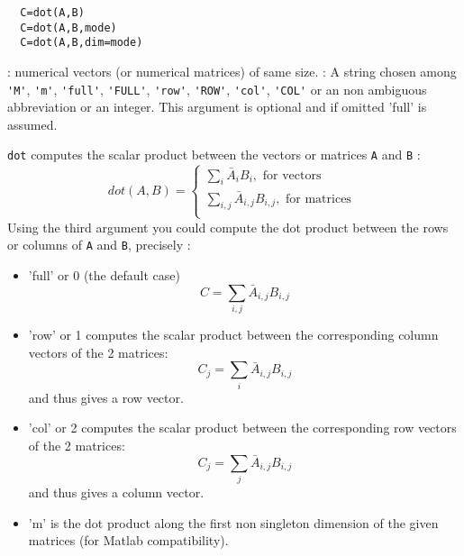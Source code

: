 \begin{mandesc}
\end{mandesc}
\begin{calling_sequence}
\begin{verbatim}
  C=dot(A,B)  
  C=dot(A,B,mode)  
  C=dot(A,B,dim=mode)  
\end{verbatim}
\end{calling_sequence}
\begin{parameters}
  \begin{varlist}
    : numerical vectors (or numerical matrices) of same size.
    : A string chosen among \verb+'M'+, \verb+'m'+, \verb+'full'+, \verb+'FULL'+, \verb+'row'+,
    \verb+'ROW'+, \verb+'col'+, \verb+'COL'+ or an non ambiguous abbreviation or an integer. 
    This argument is optional and if omitted 'full' is assumed.
  \end{varlist}
\end{parameters}
\begin{mandescription}
  \verb+dot+ computes the scalar product between the vectors or matrices \verb+A+ and \verb+B+ :
$$
dot(A,B) = \left\{
\begin{array}{l}
     \sum_{i} \bar{A}_i B_i, \mbox{ for vectors } \\
     \sum_{i,j} \bar{A}_{i,j} B_{i,j}, \mbox{ for matrices } \\
\end{array} \right.
$$ 
 Using the third argument you could compute the dot product between the rows or columns of
 \verb+A+ and \verb+B+, precisely :
  \begin{itemize}
    \item 'full' or 0 (the default case) $$C= \sum_{i,j} \bar{A}_{i,j} B_{i,j}$$
    \item 'row' or 1  computes the scalar product between the corresponding column vectors 
          of the 2 matrices: $$C_j = \sum_{i} \bar{A}_{i,j} B_{i,j}$$ and thus gives a row vector.
    \item 'col' or 2  computes the scalar product between the corresponding row vectors
          of the 2 matrices: $$C_j = \sum_{j} \bar{A}_{i,j} B_{i,j}$$ and thus gives a column vector.
    \item 'm' is the dot product along the first non singleton dimension of the given matrices 
          (for Matlab compatibility). 
  \end{itemize}
\end{mandescription}

